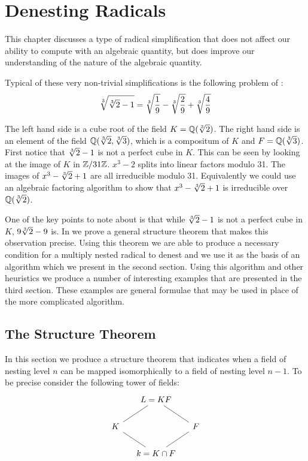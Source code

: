\chapter{Denesting Radicals}
\label{Denesting:Chap}

This chapter discusses a type of radical simplification that does not
affect our ability to compute with an algebraic quantity, but does
improve our understanding of the nature of the algebraic quantity.

Typical of these very non-trivial simplifications is the following problem
of {\Ramanujan} \cite{Ramanujuan1927-au}:
\begin{equation}
\label{Cube:2:Radical:Eq}
\root 3 \of{\root 3 \of 2 -1} 
 = \root 3 \of {\frac{1}{9}} - 
   \root 3 \of {\frac{2}{9}} + 
   \root 3 \of {\frac{4}{9}}
\end{equation}

The left hand side is a cube root of the field $K = \Q(\root 3 \of 2)$.
The right hand side is an element of the field $\Q(\root 3 \of 2, \root 3
\of 3)$, which is a compositum of $K$ and $F = \Q(\root 3 \of 3)$.  First
notice that $\root 3 \of 2 - 1$ is not a perfect cube in $K$.  This can be
seen by looking at the image of $K$ in $\mathbb{Z}/31\mathbb{Z}$.  $x^3 - 2$ splits into
linear factors modulo 31.  The images of $x^3 - \root 3 \of 2 + 1$ are all
irreducible modulo 31.  Equivalently we could use an algebraic factoring
algorithm to show that $x^3 - \root 3 \of 2 + 1$ is irreducible over
$\Q(\root 3 \of 2)$.

One of the key points to note about  is that
while $\root 3 \of 2 - 1$ is not a perfect cube in $K$, $9 \root 3 \of 2 -
9$ is.  In  we prove a general structure
theorem that makes this observation precise.  Using this theorem we are
able to produce a necessary condition for a multiply nested radical to
denest and we use it as the basis of an algorithm which we present in the
second section.  Using this algorithm and other heuristics we produce a
number of interesting examples that are presented in the third section.
These examples are general formulae that may be used in place of the more
complicated algorithm.

\section{The Structure Theorem}
\label{Denesting:Structure:Sec}

In this section we produce a structure theorem that indicates 
when a field of nesting level $n$ can be mapped isomorphically to a field
of nesting level $n - 1$.  To be precise consider the following tower
of fields: 
\[
\begin{tikzcd}[column sep=small]
                            &L=KF \arrow[dash]{ld} \arrow[dash]{rd}  & \\
K \arrow[dash]{rd} & & F\arrow[dash]{ld} \\
& k= K\cap F & 
\end{tikzcd}
\]

